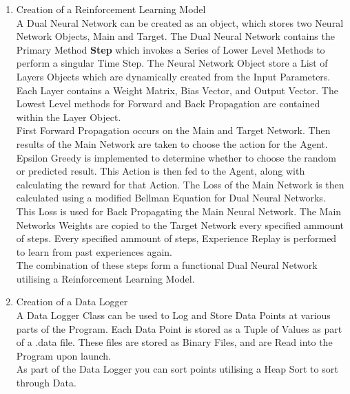 \begin{flushleft}
\begin{enumerate}
\begin{enumerate}
                    \vspace{0.5cm}   
                \item Creation of a Reinforcement Learning Model \\
                    \vspace{0.2cm}
                    A Dual Neural Network can be created as an object, which stores two Neural Network Objects, Main and Target. The Dual Neural Network
                    contains the Primary Method \textbf{Step} which invokes a Series of Lower Level Methods to perform a singular Time Step. The Neural 
                    Network Object store a List of Layers Objects which are dynamically created from the Input Parameters. Each Layer contains a Weight 
                    Matrix, Bias Vector, and Output Vector. The Lowest Level methods for Forward and Back Propagation are contained within the Layer Object. \\
                    \vspace{0.2cm}
                    First Forward Propagation occurs on the Main and Target Network. Then results of the Main Network are taken to choose the action for the Agent. 
                    Epsilon Greedy is implemented to determine whether to choose the random or predicted result. This Action is then fed to the Agent, along with 
                    calculating the reward for that Action. The Loss of the Main Network is then calculated using a modified Bellman Equation for Dual Neural 
                    Networks. This Loss is used for Back Propagating the Main Neural Network. The Main Networks Weights are copied to the Target Network
                    every specified ammount of steps. Every specified ammount of steps, Experience Replay is performed to learn from past experiences again. \\
                    \vspace{0.2cm}
                    The combination of these steps form a functional Dual Neural Network utilising a Reinforcement Learning Model. \\

                    \vspace{0.5cm}   
                \item Creation of a Data Logger \\
                    \vspace{0.2cm}
                    A Data Logger Class can be used to Log and Store Data Points at various parts of the Program. Each Data Point is stored as a Tuple of Values
                    as part of a .data file. These files are stored as Binary Files, and are Read into the Program upon launch. \\
                    \vspace{0.2cm}
                    As part of the Data Logger you can sort points utilising a Heap Sort to sort through Data. \\


\end{enumerate}
\end{enumerate}
\end{flushleft}
